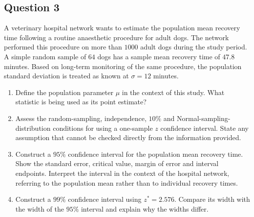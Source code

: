 \documentclass[10pt,letterpaper]{article}
\begin{document}
\subsection*{Question 3}
A veterinary hospital network wants to estimate the population mean recovery time following a routine anaesthetic procedure for adult dogs. The network performed this procedure on more than $1000$ adult dogs during the study period. A simple random sample of $64$ dogs has a sample mean recovery time of $47.8$ minutes. Based on long-term monitoring of the same procedure, the population standard deviation is treated as known at $\sigma=12$ minutes.
\begin{enumerate}
	\item Define the population parameter $\mu$ in the context of this study. What statistic is being used as its point estimate?
	\item Assess the random-sampling, independence, $10\%$ and Normal-sampling-distribution conditions for using a one-sample $z$ confidence interval. State any assumption that cannot be checked directly from the information provided.
	\item Construct a $95\%$ confidence interval for the population mean recovery time. Show the standard error, critical value, margin of error and interval endpoints. Interpret the interval in the context of the hospital network, referring to the population mean rather than to individual recovery times.
	\item Construct a $99\%$ confidence interval using $z^*=2.576$. Compare its width with the width of the $95\%$ interval and explain why the widths differ.
\end{enumerate}

\end{document}
